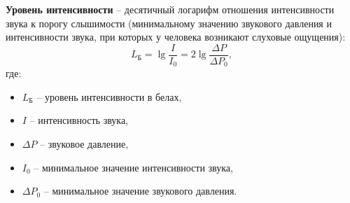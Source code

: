 \documentclass[referat,times]{SCWorks}
\begin{document}
\par \textbf{Уровень интенсивности} -- десятичный логарифм отношения интенсивности звука к порогу слышимости (минимальному значению звукового давления и интенсивности звука, при которых у человека возникают слуховые ощущения):
\begin{equation}
    L_\text{Б} = \lg{\frac{I}{I_0}} = 2 \lg{\frac{\Delta P}{\Delta P_0}},
\end{equation}
где:
\begin{itemize}
    \item $L_\text{Б}$ -- уровень интенсивности в белах,
    \item $I$ -- интенсивность звука,
    \item $\Delta P$ -- звуковое давление,
    \item $I_0$ -- минимальное значение интенсивности звука,
    \item $\Delta P_0$ -- минимальное значение звукового давления.
\end{itemize}
\end{document}

